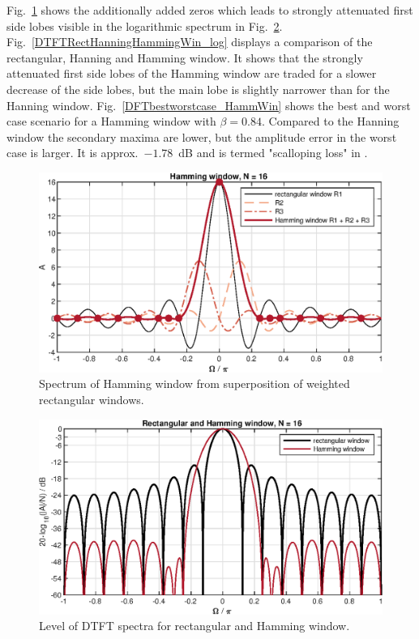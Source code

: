 \documentclass[11pt,a4paper,DIV=12]{scrartcl}
\begin{document}
Fig.~\ref{HammingausRectWindow} shows the additionally added zeros which leads
to strongly attenuated first side lobes visible in the logarithmic spectrum in
Fig.~\ref{DTFTHammingWin_log}.
%
Fig.~\ref{DTFTRectHanningHammingWin_log} displays a comparison of the
rectangular, Hanning and Hamming window.
%
It shows that the strongly attenuated first side lobes of the Hamming window
are traded for a slower decrease of the side lobes, but the main lobe is
slightly narrower than for the Hanning window.
%
Fig.~\ref{DFTbestworstcase_HammWin} shows the best and worst case scenario for
a Hamming window with $\beta=0.84$.
%
Compared to the Hanning window the secondary maxima are lower, but the
amplitude error in the worst case is larger.
%
It is approx.~$-1.78$~dB and is termed "scalloping loss" in \cite{Harris1978}.
\begin{figure}
		\centering
		\includegraphics[]{graphics/HammingausRectWindow}
		\caption{Spectrum of Hamming window from superposition of weighted
		rectangular windows.}
		\label{HammingausRectWindow}
\end{figure}
\begin{figure}
		\centering
		\includegraphics[]{graphics/DTFTHammingWin_log}
		\caption{Level of DTFT spectra for rectangular and Hamming window.}
		\label{DTFTHammingWin_log}
\end{figure}
\end{document}
